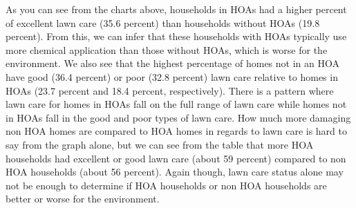 \documentclass{article}
\begin{document}
As you can see from the charts above, households in HOAs had a higher percent of excellent lawn care (35.6 percent) than households without HOAs (19.8 percent). From this, we can infer that these households with HOAs typically use more chemical application than those without HOAs, which is worse for the environment. We also see that the highest percentage of homes not in an HOA have good (36.4 percent) or poor (32.8 percent) lawn care relative to homes in HOAs (23.7 percent and 18.4 percent, respectively). There is a pattern where lawn care for homes in HOAs fall on the full range of lawn care while homes not in HOAs fall in the good and poor types of lawn care. How much more damaging non HOA homes are compared to HOA homes in regards to lawn care is hard to say from the graph alone, but we can see from the table that more HOA households had excellent or good lawn care (about 59 percent) compared to non HOA households (about 56 percent). Again though, lawn care status alone may not be enough to determine if HOA households or non HOA households are better or worse for the environment. 
\end{document}

